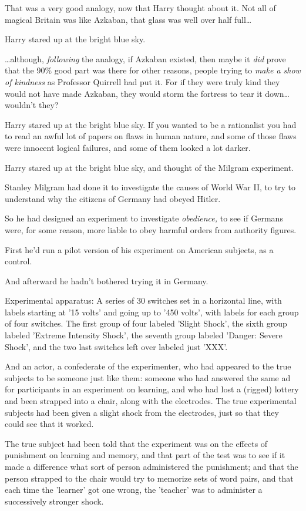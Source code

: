 That was a very good analogy, now that Harry thought about it. Not all of 
magical Britain was like Azkaban, that glass was well over half full{\ldots}

Harry stared up at the bright blue sky.

{\ldots}although, \emph{following} the analogy, if Azkaban existed, then maybe 
it \emph{did} prove that the 90\% good part was there for other reasons, people 
trying to \emph{make a show of kindness} as Professor Quirrell had put it. For 
if they were truly kind they would not have made Azkaban, they would storm the 
fortress to tear it down{\ldots} wouldn't they?

Harry stared up at the bright blue sky. If you wanted to be a rationalist you 
had to read an awful lot of papers on flaws in human nature, and some of those 
flaws were innocent logical failures, and some of them looked a lot darker.

Harry stared up at the bright blue sky, and thought of the Milgram experiment.

Stanley Milgram had done it to investigate the causes of World War II, to try 
to understand why the citizens of Germany had obeyed Hitler.

So he had designed an experiment to investigate \emph{obedience,} to see if 
Germans were, for some reason, more liable to obey harmful orders from 
authority figures.

First he'd run a pilot version of his experiment on American subjects, as a 
control.

And afterward he hadn't bothered trying it in Germany.

Experimental apparatus: A series of 30 switches set in a horizontal line, with 
labels starting at '15 volts' and going up to '450 volts', with labels for each 
group of four switches. The first group of four labeled 'Slight Shock', the 
sixth group labeled 'Extreme Intensity Shock', the seventh group labeled 
'Danger: Severe Shock', and the two last switches left over labeled just 'XXX'.

And an actor, a confederate of the experimenter, who had appeared to the true 
subjects to be someone just like them: someone who had answered the same ad for 
participants in an experiment on learning, and who had lost a (rigged) lottery 
and been strapped into a chair, along with the electrodes. The true 
experimental subjects had been given a slight shock from the electrodes, just 
so that they could see that it worked.

The true subject had been told that the experiment was on the effects of 
punishment on learning and memory, and that part of the test was to see if it 
made a difference what sort of person administered the punishment; and that the 
person strapped to the chair would try to memorize sets of word pairs, and that 
each time the 'learner' got one wrong, the 'teacher' was to administer a 
successively stronger shock.

